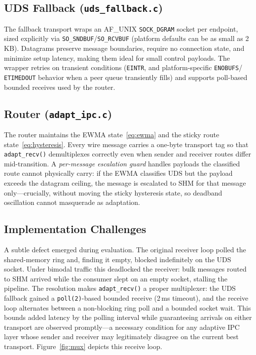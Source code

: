 \documentclass[conference]{IEEEtran}
\begin{document}
\subsection{UDS Fallback (\texttt{uds\_fallback.c})}
The fallback transport wraps an AF\_UNIX \texttt{SOCK\_DGRAM} socket per
endpoint, sized explicitly via \texttt{SO\_SNDBUF}/\texttt{SO\_RCVBUF}
(platform defaults can be as small as 2\,KB). Datagrams preserve message
boundaries, require no connection state, and minimize setup latency, making
them ideal for small control payloads. The wrapper retries on transient
conditions (\texttt{EINTR}, and platform-specific \texttt{ENOBUFS}/%
\texttt{ETIMEDOUT} behavior when a peer queue transiently fills) and supports
poll-based bounded receives used by the router.


\subsection{Router (\texttt{adapt\_ipc.c})}
The router maintains the EWMA state~\eqref{eq:ewma} and the sticky route
state~\eqref{eq:hysteresis}. Every wire message carries a one-byte transport
tag so that \texttt{adapt\_recv()} demultiplexes correctly even when sender
and receiver routes differ mid-transition. A \emph{per-message escalation
guard} handles payloads the classified route cannot physically carry: if the
EWMA classifies UDS but the payload exceeds the datagram ceiling, the message
is escalated to SHM for that message only---crucially, without moving the
sticky hysteresis state, so deadband oscillation cannot masquerade as
adaptation.

\subsection{Implementation Challenges}
A subtle defect emerged during evaluation. The original receiver loop polled
the shared-memory ring and, finding it empty, blocked indefinitely on the UDS
socket. Under bimodal traffic this deadlocked the receiver: bulk messages
routed to SHM arrived while the consumer slept on an empty socket, stalling
the pipeline. The resolution makes \texttt{adapt\_recv()} a proper
multiplexer: the UDS fallback gained a \texttt{poll(2)}-based bounded receive
(2\,ms timeout), and the receive loop alternates between a non-blocking ring
poll and a bounded socket wait. This bounds added latency by the polling
interval while guaranteeing arrivals on either transport are observed
promptly---a necessary condition for any adaptive IPC layer whose sender and
receiver may legitimately disagree on the current best transport.
Figure~\ref{fig:mux} depicts this receive loop.
\end{document}
